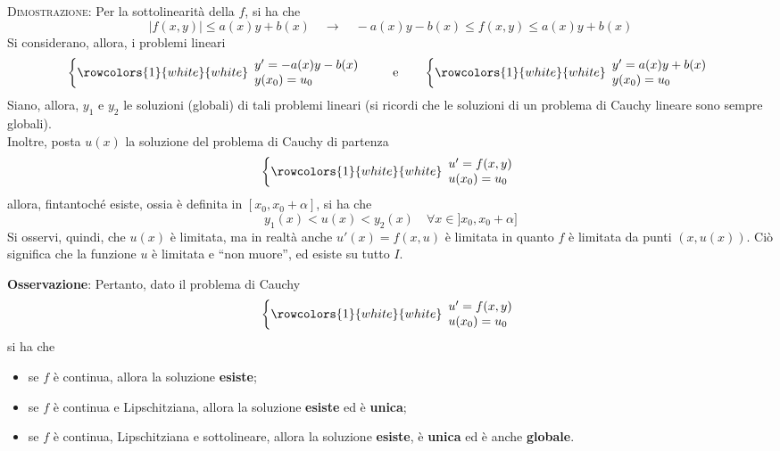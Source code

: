 \documentclass[a4paper]{extarticle}
\newcommand{\quotes}[1]{``#1''}
\begin{document}
\vspace{2em}
\noindent
\normalfont \normalsize
\textsc{Dimostrazione}: Per la sottolinearità della $f$, si ha che
\[\left\vert f(x,y) \right\vert \leq a(x)y + b(x) \hspace{1em} \rightarrow \hspace{1em} -a(x) y - b(x) \leq f(x,y) \leq a(x) y + b(x)\]
Si considerano, allora, i problemi lineari
\[\left\{
    \rowcolors{1}{white}{white}
    \begin{array}{lll}
        y'=-a(x) y - b(x)\\
        y(x_0)=u_0
    \end{array}
\right. \hspace{2em} \text{e} \hspace{2em} \left\{
    \rowcolors{1}{white}{white}
    \begin{array}{lll}
        y'=a(x) y + b(x)\\
        y(x_0)=u_0
    \end{array}
\right.\]
Siano, allora, $y_1$ e $y_2$ le soluzioni (globali) di tali problemi lineari (si ricordi che le soluzioni di un problema di Cauchy lineare sono sempre globali).\\
Inoltre, posta $u(x)$ la soluzione del problema di Cauchy di partenza
\[\left\{
    \rowcolors{1}{white}{white}
    \begin{array}{lll}
        u'=f(x,y)\\
        u(x_0)=u_0
    \end{array}
\right.\]
allora, fintantoché esiste, ossia è definita in $[x_0,x_0+\alpha]$, si ha che
\[y_1(x) < u(x) < y_2(x) \hspace{1em} \forall x \in ]x_0,x_0+\alpha]\]
Si osservi, quindi, che $u(x)$ è limitata, ma in realtà anche $u'(x) = f(x,u)$ è limitata in quanto $f$ è limitata da punti $(x,u(x))$. Ciò significa che la funzione $u$ è limitata e \quotes{non muore}, ed esiste su tutto $I$.

\vspace{2em}
\noindent
\textbf{Osservazione}: Pertanto, dato il problema di Cauchy
\[\left\{
    \rowcolors{1}{white}{white}
    \begin{array}{lll}
        u'=f(x,y)\\
        u(x_0)=u_0
    \end{array}
\right.\]
si ha che
\begin{itemize}
    \item se $f$ è continua, allora la soluzione \textbf{esiste};
    \item se $f$ è continua e Lipschitziana, allora la soluzione \textbf{esiste} ed è \textbf{unica};
    \item se $f$ è continua, Lipschitziana e sottolineare, allora la soluzione \textbf{esiste}, è \textbf{unica} ed è anche \textbf{globale}.
\end{itemize}
\end{document}
